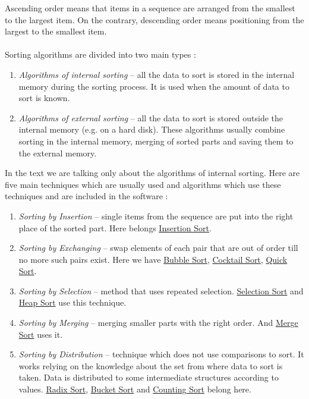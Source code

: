 \documentclass[
  field=inf,
  biblatex,
  language=english,
  glossaries,
  theorems=false,
  sourcecodes=false,
  index
]{kidiplom}
\begin{document}
Ascending order means that items in a sequence are arranged from the smallest to the largest item. On the contrary, descending order means positioning from the largest to the smallest item.
\\\\
Sorting algorithms are divided into two main types \citep{alm2}:
\begin{enumerate}
	\item \textit{Algorithms of internal sorting} -- all the data to sort is stored in the internal memory during the sorting process. It is used when the amount of data to sort is known.
	\item \textit{Algorithms of external sorting} -- all the data to sort is stored outside the internal memory (e.g. on a hard disk). These algorithms usually combine sorting in the internal memory, merging of sorted parts and saving them to the external memory.
\end{enumerate}

In the text we are talking only about the algorithms of internal sorting. Here are five main techniques which are usually used and algorithms which use these techniques and are included in the software \cite{knuth3}:
\begin{enumerate}
	\item \textit{Sorting by Insertion} -- single items from the sequence are put into the right place of the sorted part. Here belongs \hyperref[sec:insertion]{Insertion Sort}.
	\item \textit{Sorting by Exchanging} -- swap elements of each pair that are out of order till no more such pairs exist. Here we have \hyperref[sec:bubble]{Bubble Sort}, \hyperref[sec:cocktailsort]{Cocktail Sort}, \hyperref[sec:quicksort]{Quick Sort}.
	\item \textit{Sorting by Selection} -- method that uses repeated selection. \hyperref[sec:selection]{Selection Sort} and \hyperref[sec:heapsort]{Heap Sort} use this technique.
	\item \textit{Sorting by Merging} -- merging smaller parts with the right order. And \hyperref[sec:mergesort]{Merge Sort} uses it. 
	\item \textit{Sorting by Distribution} -- technique which does not use comparisons to sort. It works relying on the knowledge about the set from where data to sort is taken. Data is distributed to some intermediate structures according to values. \hyperref[sec:radixsort]{Radix Sort}, \hyperref[sec:bucketsort]{Bucket Sort} and \hyperref[sec:counting]{Counting Sort} belong here.
\end{enumerate}
\end{document}
